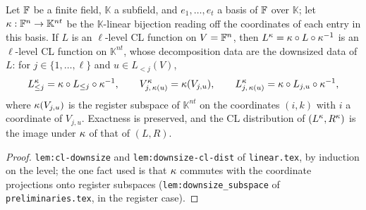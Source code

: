 \begin{lemma}[Downsizing]
\label{lem:cl-downsize}
\leanok
Let $\mathbb{F}$ be a finite field, $\mathbb{K}$ a subfield, and $e_1, \ldots, e_t$ a basis of $\mathbb{F}$
over $\mathbb{K}$; let $\kappa : \mathbb{F}^n \to \mathbb{K}^{nt}$ be the $\mathbb{K}$-linear
bijection reading off the coordinates of each entry in this basis. If $L$ is an $\ell$-level CL
function on $V = \mathbb{F}^n$, then $L^\kappa = \kappa \circ L \circ \kappa^{-1}$ is an
$\ell$-level CL function on $\mathbb{K}^{nt}$, whose decomposition data are the downsized data
of $L$: for $j \in \{1, \ldots, \ell\}$ and $u \in L_{<j}(V)$,
\begin{equation*}
  L^\kappa_{\le j} = \kappa \circ L_{\le j} \circ \kappa^{-1}, \qquad
  V^\kappa_{j,\, \kappa(u)} = \kappa(V_{j,u}), \qquad
  L^\kappa_{j,\, \kappa(u)} = \kappa \circ L_{j,u} \circ \kappa^{-1},
\end{equation*}
where $\kappa(V_{j,u})$ is the register subspace of $\mathbb{K}^{nt}$ on the coordinates
$(i, k)$ with $i$ a coordinate of $V_{j,u}$. Exactness is preserved, and the CL distribution of
$(L^\kappa, R^\kappa)$ is the image under $\kappa$ of that of $(L, R)$.
\end{lemma}

\begin{proof}
\leanok
\texttt{lem:cl-downsize} and \texttt{lem:downsize-cl-dist} of \texttt{linear.tex}, by
induction on the level; the one fact used is that $\kappa$ commutes with the coordinate
projections onto register subspaces (\texttt{lem:downsize\_subspace} of
\texttt{preliminaries.tex}, in the register case).
\end{proof}

